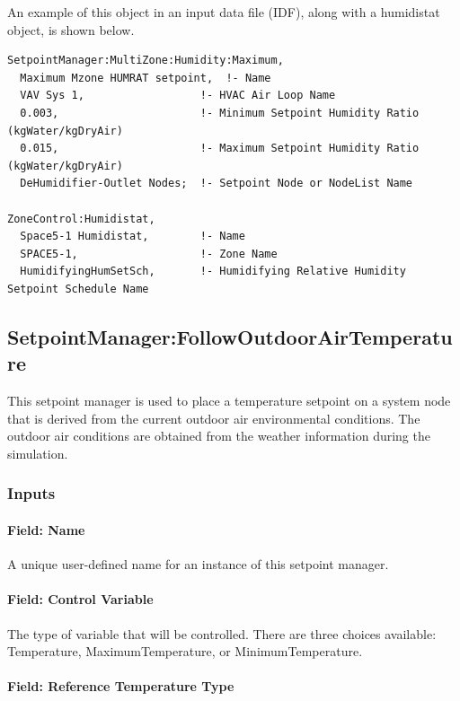 An example of this object in an input data file (IDF), along with a humidistat object, is shown below.

\begin{lstlisting}
SetpointManager:MultiZone:Humidity:Maximum,
  Maximum Mzone HUMRAT setpoint,  !- Name
  VAV Sys 1,                  !- HVAC Air Loop Name
  0.003,                      !- Minimum Setpoint Humidity Ratio (kgWater/kgDryAir)
  0.015,                      !- Maximum Setpoint Humidity Ratio (kgWater/kgDryAir)
  DeHumidifier-Outlet Nodes;  !- Setpoint Node or NodeList Name

ZoneControl:Humidistat,
  Space5-1 Humidistat,        !- Name
  SPACE5-1,                   !- Zone Name
  HumidifyingHumSetSch,       !- Humidifying Relative Humidity Setpoint Schedule Name
\end{lstlisting}

\subsection{SetpointManager:FollowOutdoorAirTemperature}\label{setpointmanagerfollowoutdoorairtemperature}

This setpoint manager is used to place a temperature setpoint on a system node that is derived from the current outdoor air environmental conditions. The outdoor air conditions are obtained from the weather information during the simulation.

\subsubsection{Inputs}\label{inputs-20-005}

\paragraph{Field: Name}\label{field-name-20-002}

A unique user-defined name for an instance of this setpoint manager.

\paragraph{Field: Control Variable}\label{field-control-variable-14}

The type of variable that will be controlled. There are three choices available: Temperature, MaximumTemperature, or MinimumTemperature.

\paragraph{Field: Reference Temperature Type}\label{field-reference-temperature-type}

